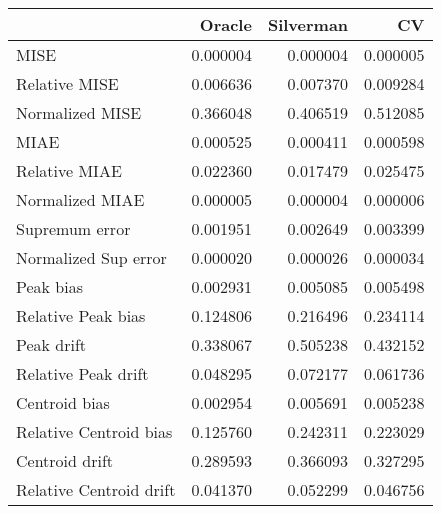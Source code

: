 \begin{tabular}{lrrr}
  \toprule
 & Oracle & Silverman & CV \\ 
  \midrule
MISE & 0.000004 & 0.000004 & 0.000005 \\ 
  Relative MISE & 0.006636 & 0.007370 & 0.009284 \\ 
  Normalized MISE & 0.366048 & 0.406519 & 0.512085 \\ 
  MIAE & 0.000525 & 0.000411 & 0.000598 \\ 
  Relative MIAE & 0.022360 & 0.017479 & 0.025475 \\ 
  Normalized MIAE & 0.000005 & 0.000004 & 0.000006 \\ 
  Supremum error & 0.001951 & 0.002649 & 0.003399 \\ 
  Normalized Sup error & 0.000020 & 0.000026 & 0.000034 \\ 
  Peak bias & 0.002931 & 0.005085 & 0.005498 \\ 
  Relative Peak bias & 0.124806 & 0.216496 & 0.234114 \\ 
  Peak drift & 0.338067 & 0.505238 & 0.432152 \\ 
  Relative Peak drift & 0.048295 & 0.072177 & 0.061736 \\ 
  Centroid bias & 0.002954 & 0.005691 & 0.005238 \\ 
  Relative Centroid bias & 0.125760 & 0.242311 & 0.223029 \\ 
  Centroid drift & 0.289593 & 0.366093 & 0.327295 \\ 
  Relative Centroid drift & 0.041370 & 0.052299 & 0.046756 \\ 
   \bottomrule
\end{tabular}
